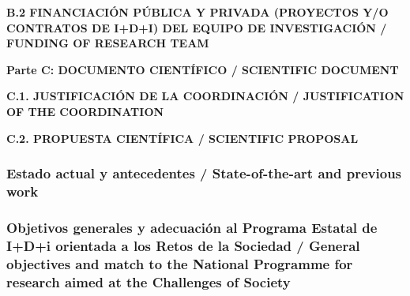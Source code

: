 \documentclass[a4paper,11pt,oneside]{article}
\begin{document}
\noindent\textbf{B.2 FINANCIACIÓN PÚBLICA Y PRIVADA (PROYECTOS Y/O CONTRATOS DE I+D+I) DEL EQUIPO DE INVESTIGACIÓN / FUNDING OF RESEARCH TEAM}
\vspace{12pt}



\newpage
\setcounter{page}{1}



\begin{tcolorbox}[colback=yellow,arc=0pt,outer arc=0pt,colframe=black,boxrule=0.6pt,left=0mm]
  \noindent\textbf{Parte C: DOCUMENTO CIENTÍFICO / SCIENTIFIC DOCUMENT}
\end{tcolorbox}

\vspace{12pt}

\noindent\textbf{C.1. JUSTIFICACIÓN DE LA COORDINACIÓN / JUSTIFICATION OF THE COORDINATION}
\vspace{12pt}



\vspace{12pt}

\noindent\textbf{C.2. PROPUESTA CIENTÍFICA / SCIENTIFIC PROPOSAL}

\subsubsection*{\label{subsubsec:stateoftheart}Estado actual y antecedentes /  State-of-the-art and previous work}




\subsubsection*{Objetivos generales y adecuación al Programa Estatal de I+D+i orientada a los Retos de la Sociedad / General objectives and match to the National Programme for research aimed at the Challenges of Society}
\end{document}
